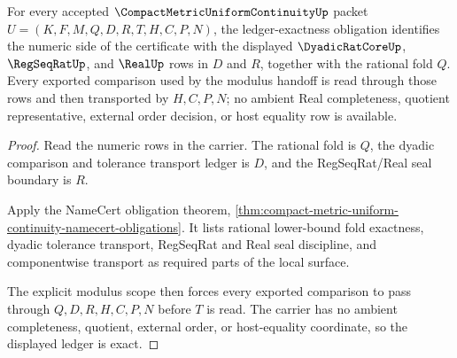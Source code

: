 \begin{theorem}
\label{thm:compact-metric-uniform-continuity-ledger-obligation}
For every accepted $\CompactMetricUniformContinuityUp$ packet $U=(K,F,M,Q,D,R,T,H,C,P,N)$, the ledger-exactness obligation identifies the numeric side of the certificate with the displayed $\DyadicRatCoreUp$, $\RegSeqRatUp$, and $\RealUp$ rows in $D$ and $R$, together with the rational fold $Q$. Every exported comparison used by the modulus handoff is read through those rows and then transported by $H,C,P,N$; no ambient Real completeness, quotient representative, external order decision, or host equality row is available.
\end{theorem}
\begin{proof}
Read the numeric rows in the carrier. The rational fold is $Q$, the dyadic comparison and tolerance transport ledger is $D$, and the RegSeqRat/Real seal boundary is $R$.

Apply the NameCert obligation theorem, \autoref{thm:compact-metric-uniform-continuity-namecert-obligations}. It lists rational lower-bound fold exactness, dyadic tolerance transport, RegSeqRat and Real seal discipline, and componentwise transport as required parts of the local surface.

The explicit modulus scope then forces every exported comparison to pass through $Q,D,R,H,C,P,N$ before $T$ is read. The carrier has no ambient completeness, quotient, external order, or host-equality coordinate, so the displayed ledger is exact.
\end{proof}


